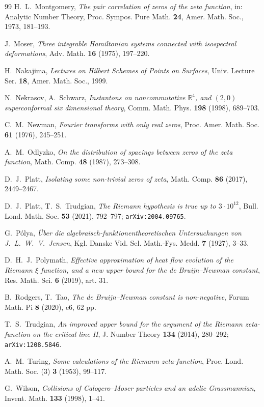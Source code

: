 \documentclass[11pt]{amsart}
\theoremstyle{remark}
\begin{document}
\begin{thebibliography}{99}
 H.~L.~Montgomery, \emph{The pair correlation of zeros of the zeta function}, in: Analytic Number Theory, Proc. Sympos. Pure Math. \textbf{24}, Amer. Math. Soc., 1973, 181--193.

 J.~Moser, \emph{Three integrable Hamiltonian systems connected with isospectral deformations}, Adv. Math. \textbf{16} (1975), 197--220.

 H.~Nakajima, \emph{Lectures on Hilbert Schemes of Points on Surfaces}, Univ. Lecture Ser. \textbf{18}, Amer. Math. Soc., 1999.

 N.~Nekrasov, A.~Schwarz, \emph{Instantons on noncommutative $\mathbb{R}^4$, and $(2,0)$ superconformal six dimensional theory}, Comm. Math. Phys. \textbf{198} (1998), 689--703.

 C.~M.~Newman, \emph{Fourier transforms with only real zeros}, Proc. Amer. Math. Soc. \textbf{61} (1976), 245--251.

 A.~M.~Odlyzko, \emph{On the distribution of spacings between zeros of the zeta function}, Math. Comp. \textbf{48} (1987), 273--308.

 D.~J.~Platt, \emph{Isolating some non-trivial zeros of zeta}, Math. Comp. \textbf{86} (2017), 2449--2467.

 D.~J.~Platt, T.~S.~Trudgian, \emph{The Riemann hypothesis is true up to $3\cdot 10^{12}$}, Bull. Lond. Math. Soc. \textbf{53} (2021), 792--797; \texttt{arXiv:2004.09765}.

 G.~P\'olya, \emph{\"Uber die algebraisch-funktionentheoretischen Untersuchungen von J.~L.~W.~V.~Jensen}, Kgl. Danske Vid. Sel. Math.-Fys. Medd. \textbf{7} (1927), 3--33.

 D.~H.~J.~Polymath, \emph{Effective approximation of heat flow evolution of the Riemann $\xi$ function, and a new upper bound for the de Bruijn--Newman constant}, Res. Math. Sci. \textbf{6} (2019), art. 31.

 B.~Rodgers, T.~Tao, \emph{The de Bruijn--Newman constant is non-negative}, Forum Math. Pi \textbf{8} (2020), e6, 62 pp.

 T.~S.~Trudgian, \emph{An improved upper bound for the argument of the Riemann zeta-function on the critical line II}, J. Number Theory \textbf{134} (2014), 280--292; \texttt{arXiv:1208.5846}.

 A.~M.~Turing, \emph{Some calculations of the Riemann zeta-function}, Proc. Lond. Math. Soc. (3) \textbf{3} (1953), 99--117.

 G.~Wilson, \emph{Collisions of Calogero--Moser particles and an adelic Grassmannian}, Invent. Math. \textbf{133} (1998), 1--41.

\end{thebibliography}
\end{document}
